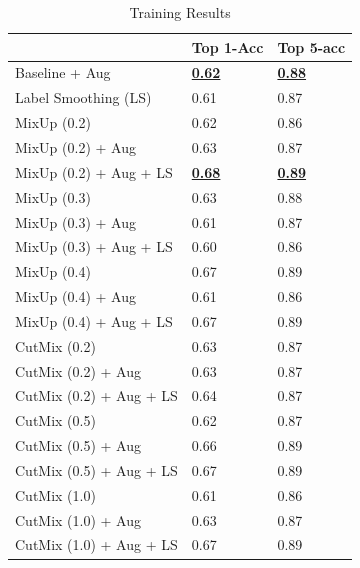\documentclass[a4paper,twoside]{article}
\begin{document}
\begin{table}[]
\small
\caption{Training Results}
\label{tab:results}
\begin{tabular}{lll}
\toprule
                & Top 1-Acc & Top 5-acc \\
\midrule
Baseline + Aug      &   \underline{\textbf{0.62}}    &  \underline{\textbf{0.88}}      \\
Label Smoothing (LS) &   0.61       &   0.87       \\
MixUp (0.2)     &  0.62        &     0.86 \\
MixUp (0.2) + Aug & 0.63 & 0.87 \\
MixUp (0.2) + Aug + LS  & \underline{\textbf{0.68}}   & \underline{\textbf{0.89}}\\
MixUp (0.3)     &  0.63        &     0.88 \\
MixUp (0.3) + Aug & 0.61 & 0.87 \\
MixUp (0.3) + Aug + LS  & 0.60   & 0.86 \\
MixUp (0.4)  &  0.67        &     0.89 \\
MixUp (0.4) + Aug & 0.61 & 0.86 \\
MixUp (0.4) + Aug + LS  & 0.67   & 0.89 \\  
CutMix (0.2) &   0.63       &   0.87  \\
CutMix (0.2) + Aug& 0.63 & 0.87 \\
CutMix (0.2) + Aug + LS  & 0.64  & 0.87\\  
CutMix (0.5)  &   0.62      &  0.87 \\
CutMix (0.5) + Aug& 0.66 & 0.89 \\
CutMix (0.5) + Aug + LS  & 0.67   & 0.89 \\ 
CutMix (1.0)  &    0.61    &   0.86   \\
CutMix (1.0) + Aug & 0.63 & 0.87 \\
CutMix (1.0) + Aug + LS  & 0.67   & 0.89 \\   
\end{tabular}
\end{table}
\end{document}

